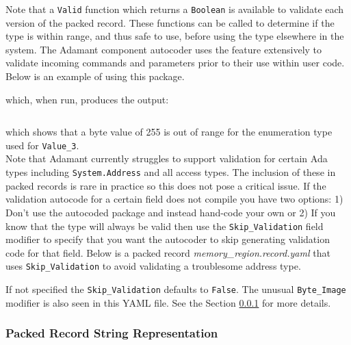 
Note that a \texttt{Valid} function which returns a \texttt{Boolean} is available to validate each version of the packed record. These functions can be called to determine if the type is within range, and thus safe to use, before using the type elsewhere in the system. The Adamant component autocoder uses the feature extensively to validate incoming commands and parameters prior to their use within user code.\\

Below is an example of using this package.


which, when run, produces the output:

\vspace{5mm} %
\inputminted{text}{../example_architecture/record_validation/output.txt}
\vspace{5mm} %

which shows that a byte value of 255 is out of range for the enumeration type used for \texttt{Value\_3}. \\

Note that Adamant currently struggles to support validation for certain Ada types including \texttt{System.Address} and all access types. The inclusion of these in packed records is rare in practice so this does not pose a critical issue. If the validation autocode for a certain field does not compile you have two options: 1) Don't use the autocoded package and instead hand-code your own or 2) If you know that the type will always be valid then use the \texttt{Skip\_Validation} field modifier to specify that you want the autocoder to skip generating validation code for that field. Below is a packed record \textit{memory\_region.record.yaml} that uses \texttt{Skip\_Validation} to avoid validating a troublesome address type.


If not specified the \texttt{Skip\_Validation} defaults to \texttt{False}. The unusual \texttt{Byte\_Image} modifier is also seen in this YAML file. See the Section \ref{Packed Record String Representation} for more details.

\subsubsection{Packed Record String Representation} \label{Packed Record String Representation}

